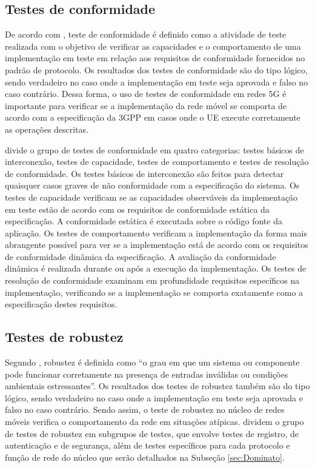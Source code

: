 \subsection{Testes de conformidade}

De acordo com , teste de conformidade é definido como a atividade de teste realizada com o objetivo de verificar as capacidades e o comportamento de uma implementação em teste em relação aos requisitos de conformidade fornecidos no padrão de protocolo.
Os resultados dos testes de conformidade são do tipo lógico, sendo verdadeiro no caso onde a implementação em teste seja aprovada e falso no caso contrário.
Dessa forma, o uso de testes de conformidade em redes 5G é importante para verificar se a implementação da rede móvel se comporta de acordo com a especificação da 3GPP em casos onde o UE execute corretamente as operações descritas.

 divide o grupo de testes de conformidade em quatro categorias: testes básicos de interconexão, testes de capacidade, testes de comportamento e testes de resolução de conformidade.
Os testes básicos de interconexão são feitos para detectar quaisquer casos graves de não conformidade com a especificação do sistema.
Os testes de capacidade verificam se as capacidades observáveis da implementação em teste estão de acordo com os requisitos de conformidade estática da especificação. A conformidade estática é executada sobre o código fonte da aplicação.
Os testes de comportamento verificam a implementação da forma mais abrangente possível para ver se a implementação está de acordo com os requisitos de conformidade dinâmica da especificação. A avaliação da conformidade dinâmica é realizada durante ou após a execução da implementação.
Os testes de resolução de conformidade examinam em profundidade requisitos específicos na implementação, verificando se a implementação se comporta exatamente como a especificação destes requisitos.

\subsection{Testes de robustez}

Segundo , robustez é definida como ``o grau em que um sistema ou componente pode funcionar corretamente na presença de entradas inválidas ou condições ambientais estressantes''.
Os resultados dos testes de robustez também são do tipo lógico, sendo verdadeiro no caso onde a implementação em teste seja aprovada e falso no caso contrário.
Sendo assim, o teste de robustez no núcleo de redes móveis verifica o comportamento da rede em situações atípicas.  dividem o grupo de testes de robustez em subgrupos de testes, que envolve testes de registro, de autenticação e de segurança, além de testes específicos para cada protocolo e função de rede do núcleo que serão detalhados na Subseção \ref{sec:Dominato}.

